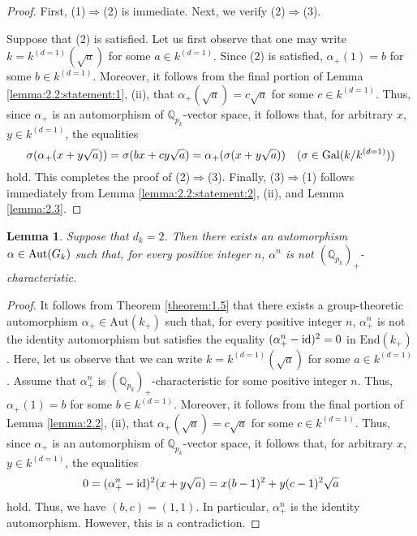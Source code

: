 \documentclass[11pt,showkeys]{article}
\theoremstyle{theorem}
\newtheorem{lem}[theorem]{Lemma}
\theoremstyle{definition}
\def\bQ{{\mathbb Q}}
\def\End{{\mbox{End}}}
\def\Aut{{\mbox{Aut}}}
\begin{document}
\begin{proof}
First, (1)$\Longrightarrow$(2) is immediate. Next, we verify (2)$\Longrightarrow$(3). 
\begin{comment}
We can write $k=k^{(d=1)}(\sqrt{a})$ for some a $\in k^{(d=1)}$. Since assertion (ii) holds and $\alpha_{+}$ is a isomorphism of $\bQ_{p_k}$-vector spaces, $\alpha_{+}(x+y \sqrt{a}) = x + y'\sqrt{a}$ for some $y' \in k^{(d=1)}$. Thus, $\sigma( \alpha_{+}(x+y \sqrt{a}) ) = \sigma(x + y'\sqrt{a} ) = x - y'\sqrt{a} = \alpha(\sigma(x+y\sqrt{a}))$. This completes the proof of (2)$\Longrightarrow$(3). 
\end{comment}
Suppose that (2) is satisfied.  Let us first observe that one may write $k = k^{(d=1)}(\sqrt{a})$ for some $a \in k^{(d=1)}$.  Since (2) is satisfied, $\alpha_+(1) = b$ for some $b \in k^{(d=1)}$.  Moreover, it follows from the final portion of Lemma \ref{lemma:2.2:statement:1}, (ii), that $\alpha_+(\sqrt{a}) = c \sqrt{a}$ for some $c \in k^{(d=1)}$. Thus, since $\alpha_+$ is an automorphism of $\bQ_{p_k}$-vector space, it follows that, for arbitrary $x$, $y \in k^{(d=1)}$, the equalities 
\[
\sigma(\alpha_{+}(x+y \sqrt{a})) = \sigma(bx + cy\sqrt{a}) =  \alpha_+(\sigma(x+y\sqrt{a})) \ \ \ (\sigma \in {\rm Gal}(k/k^{(d=1)}))
\]
hold. This completes the proof of (2)$\Longrightarrow$(3). 
Finally, (3)$\Longrightarrow$(1) follows immediately from Lemma \ref{lemma:2.2:statement:2}, (ii), and Lemma \ref{lemma:2.3}. 
\end{proof}

\begin{lem}\label{lemma:2.5}
Suppose that $d_k = 2$. Then there exists an automorphism $\alpha \in {\rm Aut}(G_k)$ such that, for every positive integer $n$, $\alpha^n$ is not $(\bQ_{p_k})_{+}$-characteristic. 
\end{lem}
\begin{proof}
It follows from Theorem \ref{theorem:1.5} that there exists a group-theoretic automorphism $\alpha_{+} \in \Aut(k_+)$ such that, for every positive integer $n$, $\alpha_+^n$ is not the identity automorphism but satisfies the equality  $(\alpha^n_{+} -{\rm id})^2 = 0$ in $\End(k_+)$. 
Here, let us observe that we can write $k = k^{(d=1)}(\sqrt{a})$ for some $a \in k^{(d=1)}$. 
Assume that $\alpha^n_+$ is $(\bQ_{p_k})_{+}$-characteristic for some positive integer $n$. 
Thus, $\alpha_+(1) = b$ for some $b \in k^{(d=1)}$.  Moreover, it follows from the final portion of Lemma \ref{lemma:2.2}, (ii), that $\alpha_+(\sqrt{a}) = c\sqrt{a}$ for some $c \in k^{(d=1)}$.  Thus, since $\alpha_+$ is an automorphism of $\bQ_{p_k}$-vector space, it follows that, for arbitrary $x$, $y \in k^{(d=1)}$, the equalities 
\begin{eqnarray}
0 = (\alpha^n_{+} -{\rm id})^2(x+y\sqrt{a}) = x (b - 1)^2 + y (c-1)^2 \sqrt{a}  \nonumber
\end{eqnarray}
hold. Thus, we have $(b, c) = (1, 1)$. 
In particular, $\alpha^n_{+}$ is the identity automorphism. However, this is a contradiction. 
\end{proof}
\end{document}
